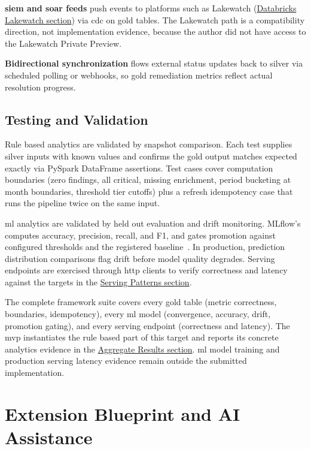 \textbf{\gls{siem} and \gls{soar} feeds} push events to platforms such as Lakewatch (\hyperref[sec:lakewatch]{Databricks Lakewatch section}) via \gls{cdc} on gold tables. The Lakewatch path is a compatibility direction, not implementation evidence, because the author did not have access to the Lakewatch Private Preview.

\textbf{Bidirectional synchronization} flows external status updates back to silver via scheduled polling or webhooks, so gold remediation metrics reflect actual resolution progress.


\subsection{Testing and Validation}
\label{sec:analytics-testing}

Rule based analytics are validated by snapshot comparison. Each test supplies silver inputs with known values and confirms the gold output matches expected exactly via PySpark DataFrame assertions. Test cases cover computation boundaries (zero findings, all critical, missing enrichment, period bucketing at month boundaries, threshold tier cutoffs) plus a refresh idempotency case that runs the pipeline twice on the same input.

\Gls{ml} analytics are validated by held out evaluation and drift monitoring. MLflow's  computes accuracy, precision, recall, and F1, and  gates promotion against configured thresholds and the registered baseline~\cite{MLflow2025}. In production, prediction distribution comparisons flag drift before model quality degrades. Serving endpoints are exercised through \gls{http} clients to verify correctness and latency against the targets in the \hyperref[sec:serving-patterns]{Serving Patterns section}.

The complete framework suite covers every gold table (metric correctness, boundaries, idempotency), every \gls{ml} model (convergence, accuracy, drift, promotion gating), and every serving endpoint (correctness and latency). The \gls{mvp} instantiates the rule based part of this target and reports its concrete analytics evidence in the \hyperref[sec:impl-results]{Aggregate Results section}. \Gls{ml} model training and production serving latency evidence remain outside the submitted implementation.

\section{Extension Blueprint and AI Assistance}
\label{sec:extension-blueprint-ai}

